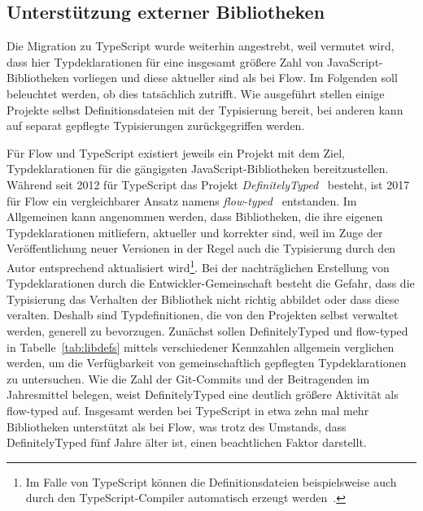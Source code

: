 \subsection{Unterstützung externer Bibliotheken}

Die Migration zu TypeScript wurde weiterhin angestrebt, weil vermutet wird, dass hier Typdeklarationen für eine insgesamt größere Zahl von JavaScript-Bibliotheken vorliegen und diese aktueller sind als bei Flow. Im Folgenden soll beleuchtet werden, ob dies tatsächlich zutrifft. Wie ausgeführt stellen einige Projekte selbst Definitionsdateien mit der Typisierung bereit, bei anderen kann auf separat gepflegte Typisierungen zurückgegriffen werden.

Für Flow und TypeScript existiert jeweils ein Projekt mit dem Ziel, Typdeklarationen für die gängigsten JavaScript-Bibliotheken bereitzustellen. Während seit 2012 für TypeScript das Projekt \textit{DefinitelyTyped}~\autocite{DEFINITELY_TYPED} besteht, ist 2017 für Flow ein vergleichbarer Ansatz namens \textit{flow-typed}~\autocite{FLOW_TYPED} entstanden. Im Allgemeinen kann angenommen werden, dass Bibliotheken, die ihre eigenen Typdeklarationen mitliefern, aktueller und korrekter sind, weil im Zuge der Veröffentlichung neuer Versionen in der Regel auch die Typisierung durch den Autor entsprechend aktualisiert wird\footnote{Im Falle von TypeScript können die Definitionsdateien beispielsweise auch durch den TypeScript-Compiler automatisch erzeugt werden~\autocite{TSC:OPTIONS}.}. Bei der nachträglichen Erstellung von Typdeklarationen durch die Entwickler-Gemeinschaft besteht die Gefahr, dass die Typisierung das Verhalten der Bibliothek nicht richtig abbildet oder dass diese veralten. Deshalb sind Typdefinitionen, die von den Projekten selbst verwaltet werden, generell zu bevorzugen. Zunächst sollen DefinitelyTyped und flow-typed in Tabelle~\ref{tab:libdefs} mittels verschiedener Kennzahlen allgemein verglichen werden, um die Verfügbarkeit von gemeinschaftlich gepflegten Typdeklarationen zu untersuchen. Wie die Zahl der Git-Commits und der Beitragenden im Jahresmittel belegen, weist DefinitelyTyped eine deutlich größere Aktivität als flow-typed auf. Insgesamt werden bei TypeScript in etwa zehn mal mehr Bibliotheken unterstützt als bei Flow, was trotz des Umstands, dass DefinitelyTyped fünf Jahre älter ist, einen beachtlichen Faktor darstellt.

\tablespace


